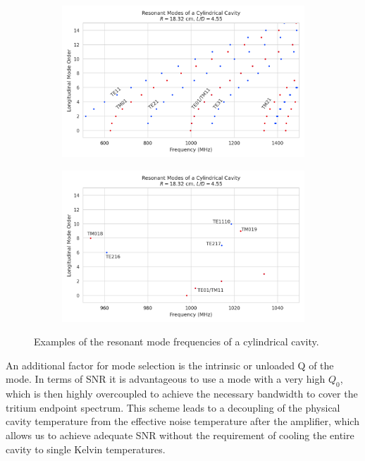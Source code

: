 \begin{figure}
    \centering
    \begin{subfigure}{0.67\textwidth}
        \centering
        \includegraphics*[width=1\textwidth]{figs/Chapter-6/230610_resmodes_1ghz_ld4pt5_wide.png}
        \caption{}
    \end{subfigure}
    \hfill
    \begin{subfigure}{0.67\textwidth}
        \centering
        \includegraphics*[width=1\textwidth]{figs/Chapter-6/230610_resmodes_1ghz_ld4pt5.png}
        \caption{}
    \end{subfigure}
    \caption{\label{fig:chap6-res-mode-freq-cylindrical-cav} Examples of the resonant mode frequencies of a cylindrical cavity.}
\end{figure}

An additional factor for mode selection is the intrinsic or unloaded Q of the mode. In terms of SNR it is advantageous to use a mode with a very high $Q_0$, which is then highly overcoupled to achieve the necessary bandwidth to cover the tritium endpoint spectrum. This scheme leads to a decoupling of the physical cavity temperature from the effective noise temperature after the amplifier, which allows us to achieve adequate SNR without the requirement of cooling the entire cavity to single Kelvin temperatures. 

